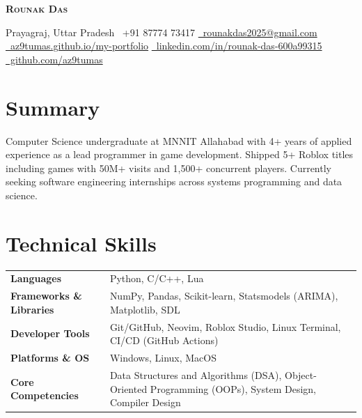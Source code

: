 \documentclass[10pt, letterpaper]{article}
\begin{document}
\begin{center}
    {\Huge\bfseries\scshape Rounak Das}
    \vspace{3pt}
    
    \small
    \faMapMarker* Prayagraj, Uttar Pradesh \quad
    \faPhone\ +91 87774 73417 \quad
    \href{mailto:rounakdas2025@gmail.com}{\faEnvelope\ rounakdas2025@gmail.com} \\[3pt]
    \href{https://az9tumas.github.io/my-portfolio/}{\faGlobe\ az9tumas.github.io/my-portfolio} \quad
    \href{https://linkedin.com/in/rounak-das-600a99315}{\faLinkedin\ linkedin.com/in/rounak-das-600a99315} \quad
    \href{https://github.com/az9tumas}{\faGithub\ github.com/az9tumas}
\end{center}
\vspace{-2pt}

\section*{Summary}
Computer Science undergraduate at MNNIT Allahabad with 4+ years of applied experience as a lead programmer in game development. Shipped 5+ Roblox titles including games with 50M+ visits and 1,500+ concurrent players. Currently seeking software engineering internships across systems programming and data science.

\section*{Technical Skills}
\begin{tabularx}{\textwidth}{@{}l X}
    \textbf{Languages} & Python, C/C++, Lua \\
    \textbf{Frameworks \& Libraries} & NumPy, Pandas, Scikit-learn, Statsmodels (ARIMA), Matplotlib, SDL \\
    \textbf{Developer Tools} & Git/GitHub, Neovim, Roblox Studio, Linux Terminal, CI/CD (GitHub Actions) \\
    \textbf{Platforms \& OS} & Windows, Linux, MacOS \\
    \textbf{Core Competencies} & Data Structures and Algorithms (DSA), Object-Oriented Programming (OOPs), System Design, Compiler Design \\
\end{tabularx}

\end{document}
